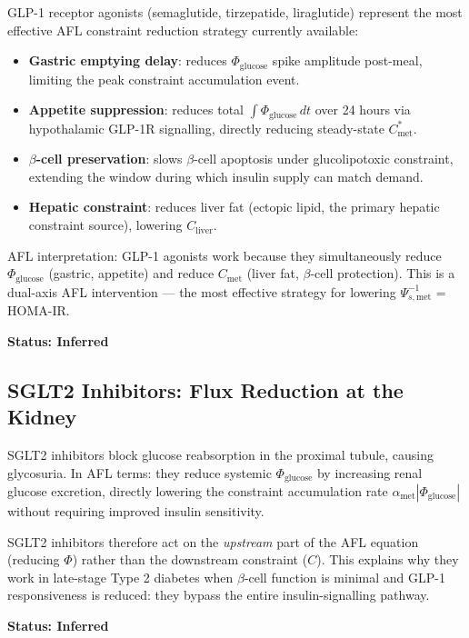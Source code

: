 \documentclass[11pt]{article}
\begin{document}
GLP-1 receptor agonists (semaglutide, tirzepatide, liraglutide) represent the most effective AFL constraint reduction strategy currently available:

\begin{itemize}
    \item \textbf{Gastric emptying delay}: reduces $\Phi_{\mathrm{glucose}}$ spike amplitude post-meal, limiting the peak constraint accumulation event.
    \item \textbf{Appetite suppression}: reduces total $\int \Phi_{\mathrm{glucose}}\, dt$ over 24 hours via hypothalamic GLP-1R signalling, directly reducing steady-state $C_{\mathrm{met}}^*$.
    \item \textbf{$\beta$-cell preservation}: slows $\beta$-cell apoptosis under glucolipotoxic constraint, extending the window during which insulin supply can match demand.
    \item \textbf{Hepatic constraint}: reduces liver fat (ectopic lipid, the primary hepatic constraint source), lowering $C_{\mathrm{liver}}$.
\end{itemize}

AFL interpretation: GLP-1 agonists work because they simultaneously reduce $\Phi_{\mathrm{glucose}}$ (gastric, appetite) and reduce $C_{\mathrm{met}}$ (liver fat, $\beta$-cell protection). This is a dual-axis AFL intervention --- the most effective strategy for lowering $\Psi_{s,\mathrm{met}}^{-1}$ = HOMA-IR.

\textbf{Status: Inferred}

\subsection{SGLT2 Inhibitors: Flux Reduction at the Kidney}

SGLT2 inhibitors block glucose reabsorption in the proximal tubule, causing glycosuria. In AFL terms: they reduce systemic $\Phi_{\mathrm{glucose}}$ by increasing renal glucose excretion, directly lowering the constraint accumulation rate $\alpha_{\mathrm{met}} |\Phi_{\mathrm{glucose}}|$ without requiring improved insulin sensitivity.

SGLT2 inhibitors therefore act on the \textit{upstream} part of the AFL equation (reducing $\Phi$) rather than the downstream constraint ($C$). This explains why they work in late-stage Type 2 diabetes when $\beta$-cell function is minimal and GLP-1 responsiveness is reduced: they bypass the entire insulin-signalling pathway.

\textbf{Status: Inferred}
\end{document}
